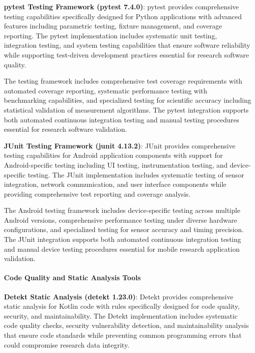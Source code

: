 \documentclass[11pt,a4paper]{article}
\begin{document}
\textbf{pytest Testing Framework (pytest 7.4.0)}: pytest provides comprehensive testing capabilities specifically designed
for Python applications with advanced features including parametric testing, fixture management, and coverage reporting.
The pytest implementation includes systematic unit testing, integration testing, and system testing capabilities that
ensure software reliability while supporting test-driven development practices essential for research software quality.

The testing framework includes comprehensive test coverage requirements with automated coverage reporting, systematic
performance testing with benchmarking capabilities, and specialized testing for scientific accuracy including
statistical validation of measurement algorithms. The pytest integration supports both automated continuous integration
testing and manual testing procedures essential for research software validation.

\textbf{JUnit Testing Framework (junit 4.13.2)}: JUnit provides comprehensive testing capabilities for Android application
components with support for Android-specific testing including UI testing, instrumentation testing, and device-specific
testing. The JUnit implementation includes systematic testing of sensor integration, network communication, and user
interface components while providing comprehensive test reporting and coverage analysis.

The Android testing framework includes device-specific testing across multiple Android versions, comprehensive
performance testing under diverse hardware configurations, and specialized testing for sensor accuracy and timing
precision. The JUnit integration supports both automated continuous integration testing and manual device testing
procedures essential for mobile research application validation.

\paragraph{Code Quality and Static Analysis Tools}

\textbf{Detekt Static Analysis (detekt 1.23.0)}: Detekt provides comprehensive static analysis for Kotlin code with rules
specifically designed for code quality, security, and maintainability. The Detekt implementation includes systematic
code quality checks, security vulnerability detection, and maintainability analysis that ensure code standards while
preventing common programming errors that could compromise research data integrity.
\end{document}

